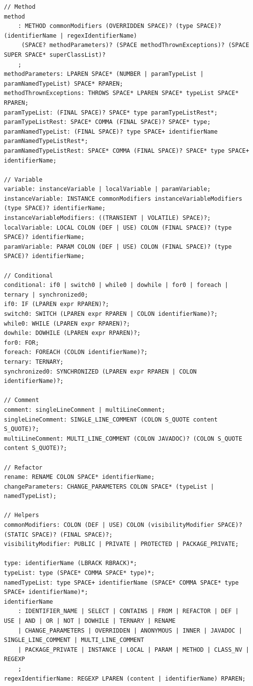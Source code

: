 \documentclass[12pt, letterpaper]{article}
\begin{document}
\begin{lstlisting}
// Method
method
    : METHOD commonModifiers (OVERRIDDEN SPACE)? (type SPACE)? (identifierName | regexIdentifierName)
     (SPACE? methodParameters)? (SPACE methodThrownExceptions)? (SPACE SUPER SPACE* superClassList)?
    ;
methodParameters: LPAREN SPACE* (NUMBER | paramTypeList | paramNamedTypeList) SPACE* RPAREN;
methodThrownExceptions: THROWS SPACE* LPAREN SPACE* typeList SPACE* RPAREN;
paramTypeList: (FINAL SPACE)? SPACE* type paramTypeListRest*;
paramTypeListRest: SPACE* COMMA (FINAL SPACE)? SPACE* type;
paramNamedTypeList: (FINAL SPACE)? type SPACE+ identifierName paramNamedTypeListRest*;
paramNamedTypeListRest: SPACE* COMMA (FINAL SPACE)? SPACE* type SPACE+ identifierName;

// Variable
variable: instanceVariable | localVariable | paramVariable;
instanceVariable: INSTANCE commonModifiers instanceVariableModifiers (type SPACE)? identifierName;
instanceVariableModifiers: ((TRANSIENT | VOLATILE) SPACE)?;
localVariable: LOCAL COLON (DEF | USE) COLON (FINAL SPACE)? (type SPACE)? identifierName;
paramVariable: PARAM COLON (DEF | USE) COLON (FINAL SPACE)? (type SPACE)? identifierName;

// Conditional
conditional: if0 | switch0 | while0 | dowhile | for0 | foreach | ternary | synchronized0;
if0: IF (LPAREN expr RPAREN)?;
switch0: SWITCH (LPAREN expr RPAREN | COLON identifierName)?;
while0: WHILE (LPAREN expr RPAREN)?;
dowhile: DOWHILE (LPAREN expr RPAREN)?;
for0: FOR;
foreach: FOREACH (COLON identifierName)?;
ternary: TERNARY;
synchronized0: SYNCHRONIZED (LPAREN expr RPAREN | COLON identifierName)?;

// Comment
comment: singleLineComment | multiLineComment;
singleLineComment: SINGLE_LINE_COMMENT (COLON S_QUOTE content S_QUOTE)?;
multiLineComment: MULTI_LINE_COMMENT (COLON JAVADOC)? (COLON S_QUOTE content S_QUOTE)?;

// Refactor
rename: RENAME COLON SPACE* identifierName;
changeParameters: CHANGE_PARAMETERS COLON SPACE* (typeList | namedTypeList);

// Helpers
commonModifiers: COLON (DEF | USE) COLON (visibilityModifier SPACE)? (STATIC SPACE)? (FINAL SPACE)?;
visibilityModifier: PUBLIC | PRIVATE | PROTECTED | PACKAGE_PRIVATE;

type: identifierName (LBRACK RBRACK)*;
typeList: type (SPACE* COMMA SPACE* type)*;
namedTypeList: type SPACE+ identifierName (SPACE* COMMA SPACE* type SPACE+ identifierName)*;
identifierName
    : IDENTIFIER_NAME | SELECT | CONTAINS | FROM | REFACTOR | DEF | USE | AND | OR | NOT | DOWHILE | TERNARY | RENAME
    | CHANGE_PARAMETERS | OVERRIDDEN | ANONYMOUS | INNER | JAVADOC | SINGLE_LINE_COMMENT | MULTI_LINE_COMMENT
    | PACKAGE_PRIVATE | INSTANCE | LOCAL | PARAM | METHOD | CLASS_NV | REGEXP
    ;
regexIdentifierName: REGEXP LPAREN (content | identifierName) RPAREN;


\end{lstlisting}
\end{document}

